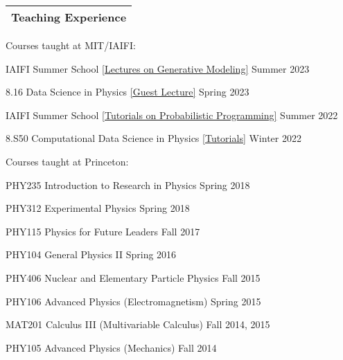 \documentclass[letterpaper,11pt]{article}
\newenvironment{packed_itemize}{
\begin{itemize}[label=\raisebox{0.25ex}{\tiny$\bullet$}]
  \setlength{\itemsep}{4.2pt}
  \setlength{\parskip}{0pt}
  \setlength{\parsep}{0pt}}{\end{itemize}
}
\begin{document}


\noindent
\begin{tabular*}{\textwidth}{l@{\extracolsep{\fill}}}
\large {\sc \Large{Teaching Experience}}\\
\hline
\end{tabular*}\vspace{3.5mm}

\noindent
Courses taught at MIT/IAIFI:
\begin{packed_itemize}
  \item IAIFI Summer School \href{https://smsharma.io/iaifi-summer-school-2023/}{[Lectures on Generative Modeling]} \hfill Summer 2023
  \item 8.16 Data Science in Physics \href{https://github.com/smsharma/sbi-lecture-mit}{[Guest Lecture]} \hfill Spring 2023
  \item IAIFI Summer School \href{https://github.com/smsharma/iaifi-summer-school-tutorials}{[Tutorials on Probabilistic Programming]} \hfill Summer 2022
  \item 8.S50 Computational Data Science in Physics \href{https://github.com/smsharma/prob-prog-8.S50-tutorial}{[Tutorials]} \hfill Winter 2022
\end{packed_itemize}

\noindent
Courses taught at Princeton:
\begin{packed_itemize}
  \item PHY235 Introduction to Research in Physics \hfill Spring 2018
  \item PHY312 Experimental Physics \hfill Spring 2018
  \item PHY115  Physics for Future Leaders \hfill Fall 2017
  \item PHY104  General Physics II \hfill Spring 2016
  \item PHY406 Nuclear and Elementary Particle Physics \hfill Fall 2015
  \item PHY106 Advanced Physics (Electromagnetism) \hfill Spring 2015
  \item MAT201 Calculus III (Multivariable Calculus) \hfill Fall 2014, 2015
  \item PHY105 Advanced Physics (Mechanics) \hfill Fall 2014
\end{packed_itemize}
\vspace{2.0mm}

\end{document}
